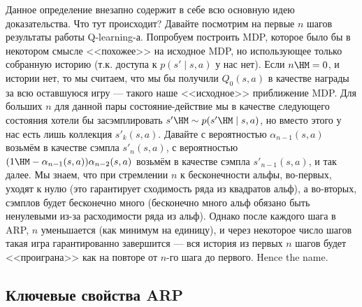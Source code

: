 Данное определение внезапно содержит в себе всю основную идею доказательства. Что тут происходит? Давайте посмотрим на первые $n$ шагов результаты работы Q-learning-а. Попробуем построить MDP, которое было бы в некотором смысле <<похожее>> на исходное MDP, но использующее только собранную историю (т.к. доступа к $p(s' \mid s, a)$ у нас нет). Если $n \HM= 0$, и истории нет, то мы считаем, что мы бы получили $Q_0(s, a)$ в качестве награды за всю оставшуюся игру --- такого наше <<исходное>> приближение MDP. Для больших $n$ для данной пары состояние-действие мы в качестве следующего состояния хотели бы засэмплировать $s' \HM\sim p(s' \HM\mid s, a)$, но вместо этого у нас есть лишь коллекция $s'_k(s, a)$. Давайте с вероятностью $\alpha_{n-1}(s, a)$ возьмём в качестве сэмпла $s'_n(s, a)$, с вероятностью $(1 \HM- \alpha_{n-1}(s, a))\alpha_{n-2}(s, a)$ возьмём в качестве сэмпла $s'_{n-1}(s, a)$, и так далее. Мы знаем, что при стремлении $n$ к бесконечности альфы, во-первых, уходят к нулю (это гарантирует сходимость ряда из квадратов альф), а во-вторых, сэмплов будет бесконечно много (бесконечно много альф обязано быть ненулевыми из-за расходимости ряда из альф). Однако после каждого шага в ARP, $n$ уменьшается (как минимум на единицу), и через некоторое число шагов такая игра гарантированно завершится --- вся история из первых $n$ шагов будет <<проиграна>> как на повторе от $n$-го шага до первого. Hence the name.

\subsection{Ключевые свойства ARP}

